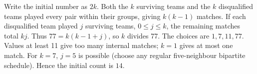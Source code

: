 Write the initial number as $2k$. Both the $k$ surviving teams and the $k$ disqualified teams played every pair within their groups, giving $k(k-1)$ matches. If each disqualified team played $j$ surviving teams, $0\le j\le k$, the remaining matches total $kj$. Thus $77=k(k-1+j)$, so $k$ divides 77. The choices are $1,7,11,77$. Values at least 11 give too many internal matches; $k=1$ gives at most one match. For $k=7$, $j=5$ is possible (choose any regular five-neighbour bipartite schedule). Hence the initial count is $\boxed{14}$.

